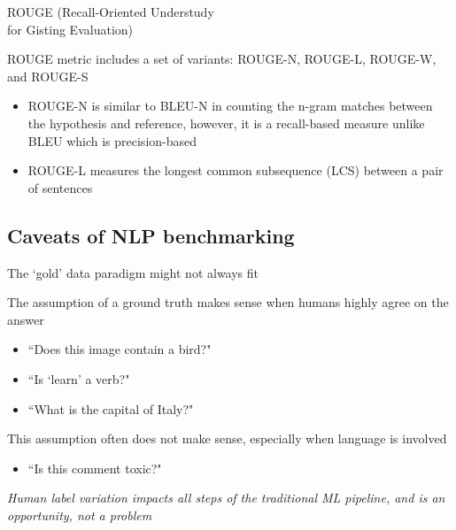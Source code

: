 \documentclass[12pt,aspectratio=169,handout]{beamer}
\begin{document}
\begin{frame}{ROUGE (Recall-Oriented Understudy\\ for Gisting Evaluation)}
	
ROUGE metric includes a set of variants: ROUGE-N, ROUGE-L, ROUGE-W, and ROUGE-S

\begin{itemize}
	\item ROUGE-N is similar to BLEU-N in counting the n-gram matches between the hypothesis and reference, however, it is a recall-based measure unlike BLEU which is precision-based
	\item ROUGE-L measures the longest common subsequence (LCS) between a pair of sentences	
\end{itemize}



\end{frame}


\subsection{Caveats of NLP benchmarking}


\begin{frame}{The `gold' data paradigm might not always fit}

The assumption of a ground truth makes sense when humans highly agree on the answer

\begin{itemize}
	\item ``Does this image contain a bird?"
	\item ``Is `learn' a verb?"
	\item ``What is the capital of Italy?"
\end{itemize}

This assumption often does not make sense, especially when language is involved

\begin{itemize}
	\item ``Is this comment toxic?"
\end{itemize}

\emph{Human label variation impacts all steps of the traditional ML pipeline, and is an opportunity, not a problem}


\end{frame}
\end{document}
